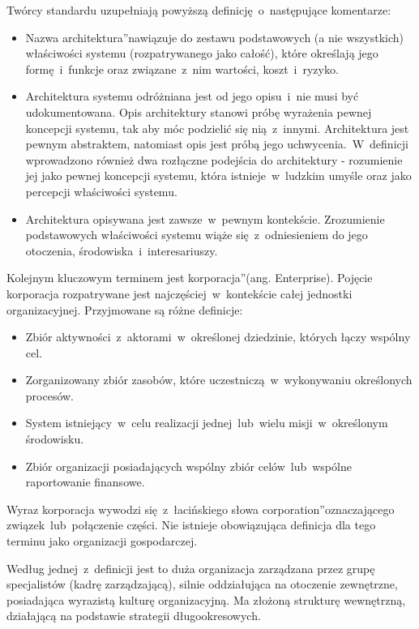 Twórcy standardu uzupełniają powyższą definicję~o~następujące komentarze: 
\begin{itemize}
\item{Nazwa \quotedblbase architektura\textquotedblright nawiązuje do zestawu podstawowych (a nie wszystkich) właściwości systemu (rozpatrywanego jako całość), które określają jego formę~i~funkcje oraz związane~z~nim wartości, koszt~i~ryzyko.}
\item{Architektura systemu odróżniana jest od jego opisu~i~nie musi być udokumentowana. Opis architektury stanowi próbę wyrażenia pewnej koncepcji systemu, tak aby móc podzielić się nią~z~innymi. Architektura jest pewnym abstraktem, natomiast opis jest próbą jego uchwycenia.~W~definicji wprowadzono również dwa rozłączne podejścia do architektury - rozumienie jej jako pewnej koncepcji systemu, która istnieje~w~ludzkim umyśle oraz jako percepcji właściwości systemu.}
\item{Architektura opisywana jest zawsze~w~pewnym kontekście. Zrozumienie podstawowych właściwości systemu wiąże się~z~odniesieniem do jego otoczenia, środowiska~i~interesariuszy.}
\end{itemize}

Kolejnym kluczowym terminem jest \quotedblbase korporacja\textquotedblright (ang. Enterprise). Pojęcie korporacja rozpatrywane jest najczęściej~w~kontekście całej jednostki organizacyjnej. Przyjmowane są różne definicje:
\begin{itemize}
\item{Zbiór aktywności~z~aktorami~w~określonej dziedzinie, których łączy wspólny cel.}
\item{Zorganizowany zbiór zasobów, które uczestniczą~w~wykonywaniu określonych procesów.}
\item{System istniejący~w~celu realizacji jednej~lub~wielu misji~w~określonym środowisku.}
\item{Zbiór organizacji posiadających wspólny zbiór celów~lub~wspólne raportowanie finansowe.}
\end{itemize}

Wyraz korporacja wywodzi się~z~łacińskiego słowa \quotedblbase corporation\textquotedblright oznaczającego związek~lub~połączenie części. Nie istnieje obowiązująca definicja dla tego terminu jako organizacji gospodarczej. 

Według jednej~z~definicji jest to duża organizacja zarządzana przez grupę specjalistów (kadrę zarządzającą), silnie oddziałująca na otoczenie zewnętrzne, posiadająca wyrazistą kulturę organizacyjną. Ma złożoną strukturę wewnętrzną, działającą na podstawie strategii długookresowych.

